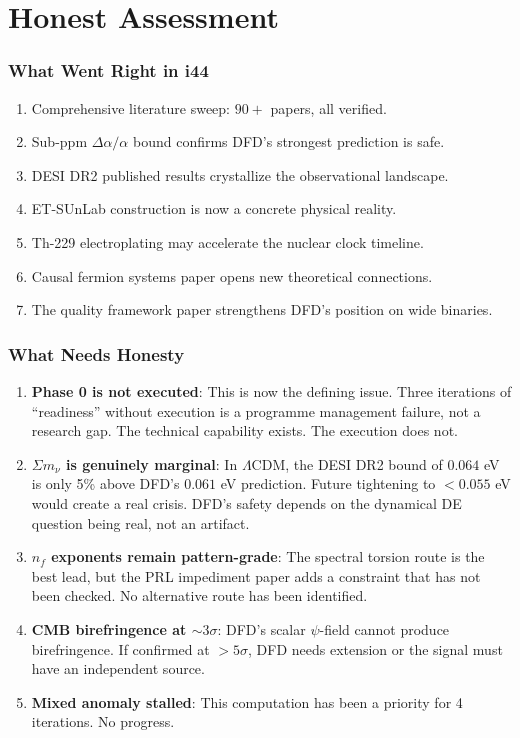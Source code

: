 \documentclass[11pt,a4paper]{article}
\begin{document}
\part{Honest Assessment}

\section{What Went Right in i44}

\begin{enumerate}
\item Comprehensive literature sweep: $90+$ papers, all verified.
\item Sub-ppm $\Delta\alpha/\alpha$ bound confirms DFD's strongest prediction is safe.
\item DESI DR2 published results crystallize the observational landscape.
\item ET-SUnLab construction is now a concrete physical reality.
\item Th-229 electroplating may accelerate the nuclear clock timeline.
\item Causal fermion systems paper opens new theoretical connections.
\item The quality framework paper strengthens DFD's position on wide binaries.
\end{enumerate}

\section{What Needs Honesty}

\begin{enumerate}
\item \textbf{Phase 0 is not executed}: This is now the defining issue. Three iterations of ``readiness'' without execution is a programme management failure, not a research gap. The technical capability exists. The execution does not.

\item \textbf{$\Sigma m_\nu$ is genuinely marginal}: In $\Lambda$CDM, the DESI DR2 bound of $0.064$ eV is only 5\% above DFD's $0.061$ eV prediction. Future tightening to $< 0.055$ eV would create a real crisis. DFD's safety depends on the dynamical DE question being real, not an artifact.

\item \textbf{$n_f$ exponents remain pattern-grade}: The spectral torsion route is the best lead, but the PRL impediment paper adds a constraint that has not been checked. No alternative route has been identified.

\item \textbf{CMB birefringence at $\sim 3\sigma$}: DFD's scalar $\psi$-field cannot produce birefringence. If confirmed at $> 5\sigma$, DFD needs extension or the signal must have an independent source.

\item \textbf{Mixed anomaly stalled}: This computation has been a priority for 4 iterations. No progress.
\end{enumerate}
\end{document}

